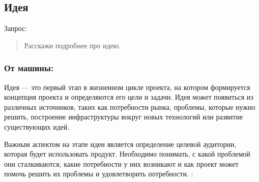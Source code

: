 \documentclass[letterpaper,10pt,russian]{sphinxmanual}
\begin{document}
\subsection{Идея}
\label{\detokenize{educational_materials/stages/content:id5}}
\sphinxAtStartPar
Запрос:
\begin{quote}

\sphinxAtStartPar
Расскажи подробнее про идею.
\end{quote}


\subsubsection{От машины:}
\label{\detokenize{educational_materials/stages/content:id6}}
\sphinxAtStartPar
Идея — это первый этап в жизненном цикле проекта, на котором формируется концепция проекта и определяются его цели и задачи. Идея может появиться из различных источников, таких как потребности рынка, проблемы, которые нужно решить, построение инфраструктуры вокруг новых технологий или развитие существующих идей.

\sphinxAtStartPar
Важным аспектом на этапе идеи является определение целевой аудитории, которая будет использовать продукт. Необходимо понимать, с какой проблемой они сталкиваются, какие потребности у них возникают и как проект может помочь решить их проблемы и удовлетворить потребности. : 
\end{document}
